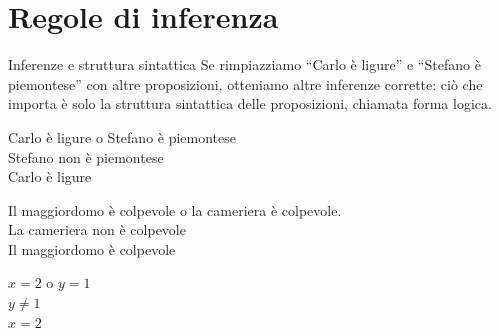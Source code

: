 \documentclass[aspectratio=169,10pt,dvipsnames,handout]{beamer}
\begin{document}
\section{Regole di inferenza}

\begin{frame}{Inferenze e struttura sintattica}
	Se rimpiazziamo ``Carlo è ligure'' e ``Stefano è piemontese'' con altre proposizioni, otteniamo altre inferenze corrette: ciò che importa è solo la struttura sintattica delle proposizioni, chiamata \alert{forma logica}.
	\begin{example}
		\centering
		\begin{inference}
			Carlo è ligure o Stefano è piemontese\\
			Stefano non è piemontese\\
			\hline
			Carlo è ligure
		\end{inference}

		\medskip
		\begin{inference}
			Il maggiordomo è colpevole o la cameriera è colpevole.\\
			La cameriera non è colpevole\\
			\hline
			Il maggiordomo è colpevole
		\end{inference}

		\medskip
		\begin{inference}
			$x=2$ o $y=1$\\
			$y \neq 1$\\
			\hline
			$x=2$
		\end{inference}
	\end{example}
\end{frame}
\end{document}
